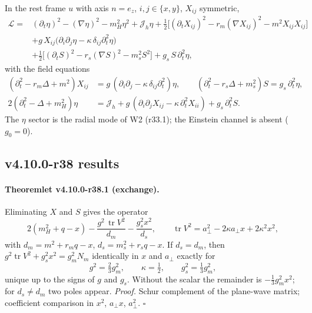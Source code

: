 In the rest frame \(u\) with axis \(n=e_z\), \(i,j\in\{x,y\}\), \(X_{ij}\) symmetric,
\[
\begin{aligned}
\mathcal L={}&(\partial_t\eta)^2-(\nabla\eta)^2-m_H^2\eta^2+\mathcal J_h\eta
+\tfrac12\bigl[(\partial_tX_{ij})^2-r_m(\nabla X_{ij})^2-m^2X_{ij}X_{ij}\bigr]\\
&+g\,X_{ij}\bigl(\partial_i\partial_j\eta-\kappa\,\delta_{ij}\partial_t^2\eta\bigr)\\
&+\tfrac12\bigl[(\partial_tS)^2-r_s(\nabla S)^2-m_s^2S^2\bigr]+g_s\,S\,\partial_t^2\eta ,
\end{aligned}
\]
with the field equations
\[
\begin{aligned}
(\partial_t^2-r_m\Delta+m^2)X_{ij}&=g\,(\partial_i\partial_j-\kappa\,\delta_{ij}\partial_t^2)\eta,\qquad
(\partial_t^2-r_s\Delta+m_s^2)S=g_s\,\partial_t^2\eta,\\
2(\partial_t^2-\Delta+m_H^2)\eta&=\mathcal J_h+g\,(\partial_i\partial_jX_{ij}-\kappa\,\partial_t^2X_{ii})+g_s\,\partial_t^2S .
\end{aligned}
\]
The \(\eta\) sector is the radial mode of W2 (r33.1); the Einstein channel is absent (\(g_0=0\)).

\subsection*{v4.10.0-r38 results}
\label{subsec:v4100-r38-results}

\paragraph{Theoremlet v4.10.0-r38.1 (exchange).}
Eliminating \(X\) and \(S\) gives the operator
\[
 2(m_H^2+q-x)-\frac{g^2\,\operatorname{tr}V^2}{d_m}-\frac{g_s^2x^2}{d_s},\qquad \operatorname{tr}V^2=a_\perp^2-2\kappa a_\perp x+2\kappa^2x^2,
\]
with \(d_m=m^2+r_mq-x\), \(d_s=m_s^2+r_sq-x\).  If \(d_s=d_m\), then \(g^2\operatorname{tr}V^2+g_s^2x^2=g_m^2N_m\) identically in \(x\) and \(a_\perp\) exactly for
\[
 g^2=\tfrac23g_m^2,\qquad \kappa=\tfrac12,\qquad g_s^2=\tfrac13g_m^2,
\]
unique up to the signs of \(g\) and \(g_s\).  Without the scalar the remainder is \(-\tfrac13g_m^2x^2\); for \(d_s\neq d_m\) two poles appear.
\emph{Proof.} Schur complement of the plane-wave matrix; coefficient comparison in \(x^2\), \(a_\perp x\), \(a_\perp^2\).  \(\square\)

